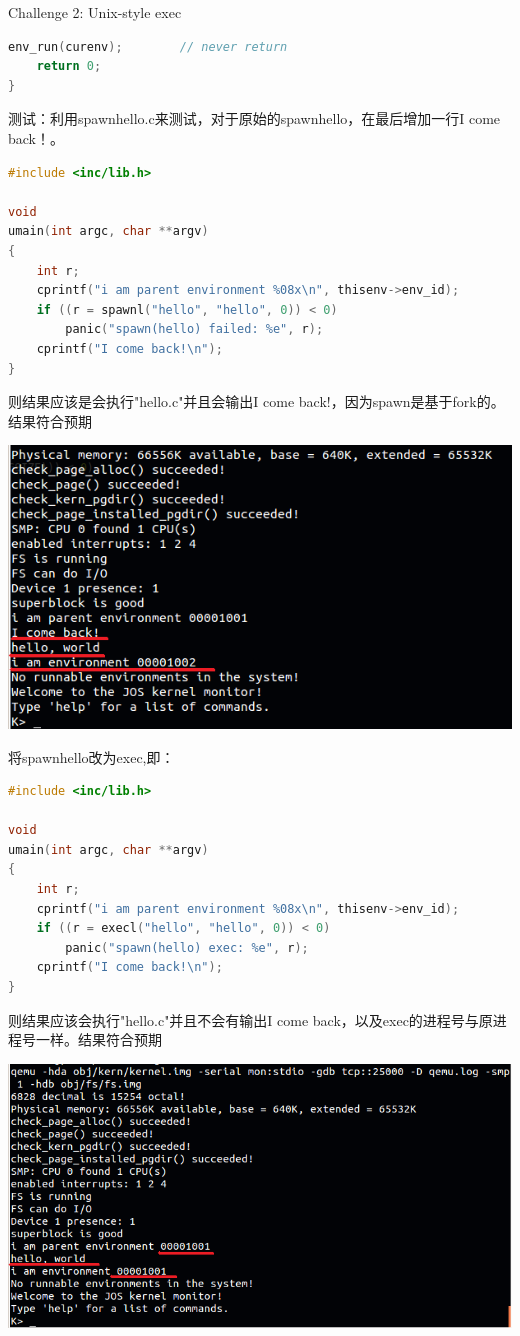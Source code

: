 \documentclass[GBK,winfonts,a4paper,10pt]{ctexart}
\begin{document}
\begin{section}{ \textcolor[rgb]{1.00,0.00,0.00}{Challenge 2: Unix-style exec} }
\begin{lstlisting}[language = C]
	env_run(curenv);		// never return
	return 0;
}
\end{lstlisting}

\par
测试：利用spawnhello.c来测试，对于原始的spawnhello，在最后增加一行I come back！。
\begin{lstlisting}[language = C]
#include <inc/lib.h>

void
umain(int argc, char **argv)
{
	int r;
	cprintf("i am parent environment %08x\n", thisenv->env_id);
	if ((r = spawnl("hello", "hello", 0)) < 0)
		panic("spawn(hello) failed: %e", r);
	cprintf("I come back!\n");
}
\end{lstlisting}
\par
则结果应该是会执行"hello.c"并且会输出I come back!，因为spawn是基于fork的。结果符合预期
\par
\includegraphics[scale=0.5]{ch1.png}
\par
将spawnhello改为exec,即：
\begin{lstlisting}[language = C]
#include <inc/lib.h>

void
umain(int argc, char **argv)
{
	int r;
	cprintf("i am parent environment %08x\n", thisenv->env_id);
	if ((r = execl("hello", "hello", 0)) < 0)
		panic("spawn(hello) exec: %e", r);
	cprintf("I come back!\n");
}
\end{lstlisting}
\par
则结果应该会执行"hello.c"并且不会有输出I come back，以及exec的进程号与原进程号一样。结果符合预期
\par
\includegraphics[scale=0.5]{ch2.png}
\end{section}
\end{document}
